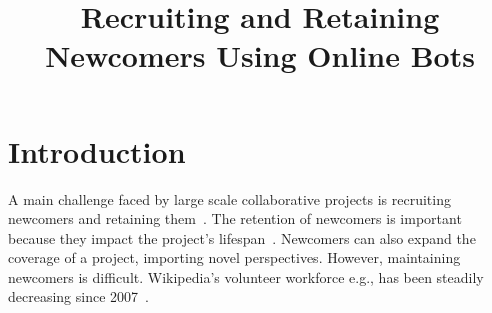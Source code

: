 \documentclass{sigchi}
\begin{document}
\title{Recruiting and Retaining Newcomers Using Online Bots}


\maketitle




\section{Introduction}
A main challenge faced by large scale collaborative projects is recruiting newcomers and retaining them~\cite{suh2009singularity}. The retention of newcomers is important because they impact the project's lifespan~\cite{halfaker2013making}. Newcomers can also expand the coverage of a project, importing novel perspectives. However, maintaining newcomers is  difficult. Wikipedia's volunteer workforce e.g., has been steadily decreasing since 2007~\cite{CHINOSAUR:venue}. 
\end{document}
